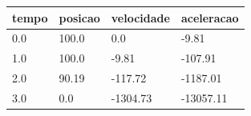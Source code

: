 \begin{tabular}{llll}
\toprule
tempo & posicao & velocidade & aceleracao \\
\midrule
0.0 & 100.0 & 0.0 & -9.81 \\
1.0 & 100.0 & -9.81 & -107.91 \\
2.0 & 90.19 & -117.72 & -1187.01 \\
3.0 & 0.0 & -1304.73 & -13057.11 \\
\bottomrule
\end{tabular}
